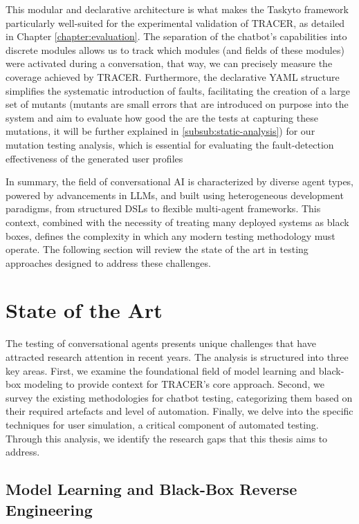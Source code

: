 This modular and declarative architecture
is what makes the Taskyto framework particularly well-suited
for the experimental validation of TRACER,
as detailed in Chapter \ref{chapter:evaluation}.
The separation of the chatbot's capabilities into discrete modules
allows us to track which modules
(and fields of these modules)
were activated during a conversation,
that way, we can precisely measure the coverage
achieved by \ac{TRACER}.
Furthermore, the declarative YAML structure
simplifies the systematic introduction of faults,
facilitating the creation of a large set of mutants
(mutants are small errors that are introduced on purpose into the system
and aim to evaluate how good the are the tests at capturing these mutations,
it will be further explained in
\autoref{subsub:static-analysis})
for our mutation testing analysis,
which is essential for evaluating
the fault-detection effectiveness of the generated user profiles

\indent

In summary,
the field of conversational \ac{AI} is characterized by diverse agent types,
powered by advancements in \acp{LLM},
and built using heterogeneous development paradigms,
from structured \acp{DSL} to flexible multi-agent frameworks.
This context, combined with the necessity of treating many deployed systems as black boxes,
defines the complexity in which any modern testing methodology must operate.
The following section will review the state of the art in testing approaches designed to address these challenges.

\section{State of the Art}\label{sec:sota}

The testing of conversational agents presents unique challenges
that have attracted research attention in recent years.
The analysis is structured into three key areas.
First, we examine the foundational field of model learning
and black-box modeling to provide context for TRACER's core approach.
Second, we survey the existing methodologies for chatbot testing,
categorizing them based on their required artefacts and level of automation.
Finally, we delve into the specific techniques for user simulation,
a critical component of automated testing.
Through this analysis, we identify the research gaps that this thesis aims to address.

\subsection{Model Learning and Black-Box Reverse Engineering}

